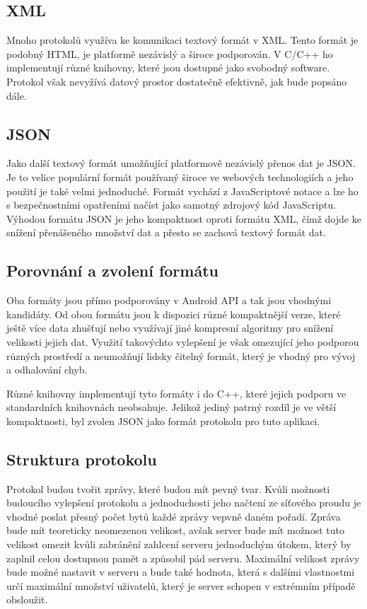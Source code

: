 \documentclass[thesis=B,czech]{FITthesis}[2013/10/20]
\begin{document}
\subsection{XML}

Mnoho protokolů využíva ke komunikaci textový formát v XML. Tento formát je podobný HTML, je platformě nezávislý a široce podporován. V C/C++ ho implementují různé knihovny, které jsou dostupné jako svobodný software. Protokol však nevyžívá datový prostor dostatečně efektivně, jak bude popsáno dále.

\subsection{JSON}

Jako další textový formát umožňující platformově nezávislý přenos dat je JSON. Je to velice populární formát používaný široce ve webových technologiích a jeho použití je také velmi jednoduché. Formát vychází z JavaScriptové notace a lze ho s bezpečnostními opatřeními načíst jako samotný zdrojový kód JavaScriptu. Výhodou formátu JSON je jeho kompaktnost oproti formátu XML, čímž dojde ke snížení přenášeného množství dat a přesto se zachová textový formát dat.

\subsection{Porovnání a zvolení formátu}

Oba formáty jsou přímo podporovány v Android API a tak jsou vhodnými kandidáty. Od obou formátu jsou k dispozici různé kompaktnější verze, které ještě více data zhušťují nebo využívají jiné kompresní algoritmy pro snížení velikosti jejich dat. Využití takovýchto vylepšení je však omezující jeho podporou různých prostředí a neumožňují lidsky čitelný formát, který je vhodný pro vývoj a odhalování chyb.

Různé knihovny implementují tyto formáty i do C++, které jejich podporu ve standardních knihovnách neobsahuje. Jelikož jediný patrný rozdíl je ve větší kompaktnosti, byl zvolen JSON jako formát protokolu pro tuto aplikaci.

\subsection{Struktura protokolu}

Protokol budou tvořit zprávy, které budou mít pevný tvar. Kvůli možnosti budoucího vylepšení protokolu a jednoduchosti jeho načtení ze síťového proudu je vhodné poslat přesný počet bytů každé zprávy vepvně daném pořadí. Zpráva bude mít teoreticky neomezenou velikost, avšak server bude mít možnost tuto velikost omezit kvůli zabránění zahlcení serveru jednoduchým útokem, který by zaplnil celou dostupnou pamět a způsobil pád serveru. Maximální velikost zprávy bude možné nastavit v serveru a bude také hodnota, která s dalšími vlastnostmi určí maximální množství uživatelů, který je server schopen v extrémním případě obsloužit.
\end{document}
